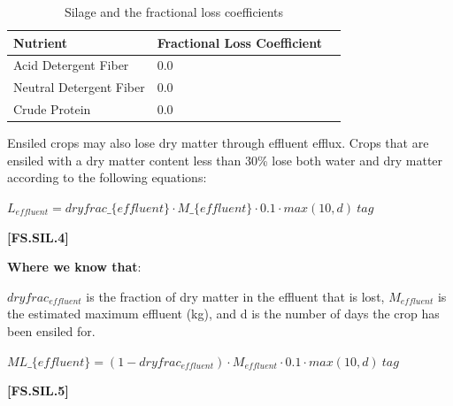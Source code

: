 \begin{refsection}
\begin{table}[h!]
\centering
\renewcommand{\arraystretch}{1.3}
\caption{Silage and the fractional loss coefficients}

\begin{tabular}{@{} L{5cm} L{4cm} L{3cm} @{}}
\toprule
\textbf{Nutrient} & \textbf{Fractional Loss Coefficient}  \\
\midrule

Acid Detergent Fiber & 0.0 \\
Neutral Detergent Fiber & 0.0 \\
Crude Protein & 0.0 \\
                           
                         
\bottomrule
\end{tabular}
\end{table}
\vspace{1CM}

Ensiled crops may also lose dry matter through effluent efflux. Crops that are ensiled with a dry matter content less than 30\% lose both water and dry matter according to the following equations:
\vspace{0.25CM}

        \begin{center}
        \(L_{effluent} = dryfrac\_\{effluent\} \cdot M\_\{effluent\} \cdot 0.1 \cdot max(10, d)\ tag\)
    \end{center}
        \vspace{0.5cm}
    
            {\raggedleft \textbf{[FS.SIL.4]}\par}
        \vspace{0.5cm}
        
\textbf{Where we know that}: \\ 
\vspace{0.2cm}

\(dryfrac_{effluent}\) is the fraction of dry matter in the effluent that is lost, \(M_{effluent}\) is the estimated maximum effluent (kg), and d is the number of days the crop has been ensiled for.
\vspace{0.5cm}

        \begin{center}
        \(ML\_\{effluent\} = (1 - dryfrac_{effluent}) \cdot M_{effluent} \cdot 0.1 \cdot max(10, d) \ tag\)
        \end{center}
        \vspace{0.5cm}
    
            {\raggedleft \textbf{[FS.SIL.5]}\par}
        \vspace{0.5cm}


\end{refsection}

